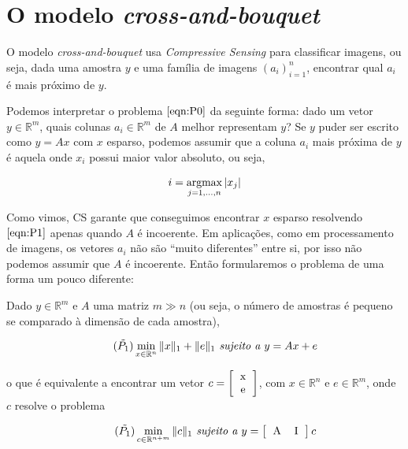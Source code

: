 \chapter{O modelo \textit{cross-and-bouquet}}


O modelo \textit{cross-and-bouquet} usa \textit{Compressive Sensing} para classificar imagens, ou seja, dada uma amostra $y$ e uma família de imagens $(a_i)_{i=1}^n$, encontrar qual $a_i$ é mais próximo de $y$.

Podemos interpretar o problema $\eqref{eqn:P0}$ da seguinte forma: dado um vetor $y \in \mathbb{R}^m$, quais colunas $a_i \in \mathbb{R}^m$ de $A$ melhor representam $y$? Se $y$ puder ser escrito como $y = Ax$ com $x$ esparso, podemos assumir que a coluna $a_i$ mais próxima de $y$ é aquela onde $x_i$ possui maior valor absoluto, ou seja,

$$ i = \argmax_{j = 1, \hdots, n} \vert x_j \vert $$

Como vimos, CS garante que conseguimos encontrar $x$ esparso resolvendo $\eqref{eqn:P1}$ apenas quando $A$ é incoerente. Em aplicações, como em processamento de imagens, os vetores $a_i$ não são ``muito diferentes'' entre si, por isso não podemos assumir que $A$ é incoerente. Então formularemos o problema de uma forma um pouco diferente:

Dado $y \in \mathbb{R}^m$ e $A$ uma matriz $m \gg n$ (ou seja, o número de amostras é pequeno se comparado à dimensão de cada amostra),

\begin{equation}
\tag{$\tilde{P_1}$}
\min_{x \in \mathbb{R}^n} \Vert x \Vert_{1} + \Vert e \Vert_{1} \textit{ sujeito a } y = Ax + e
\end{equation}

o que é equivalente a encontrar um vetor $c = \left[ \begin{tabular}{c}
x \\
e
\end{tabular} \right]$, com $x \in \mathbb{R}^n$ e $e \in \mathbb{R}^m$, onde $c$ resolve o problema

\begin{equation}
\tag{$\tilde{P_1}$}
\min_{c \in \mathbb{R}^{n + m}} \Vert c \Vert_{1} \textit{ sujeito a } y = \left[ \begin{tabular}{c c} A &  I \end{tabular} \right] c
\label{eqn:P1_tilde}
\end{equation}


